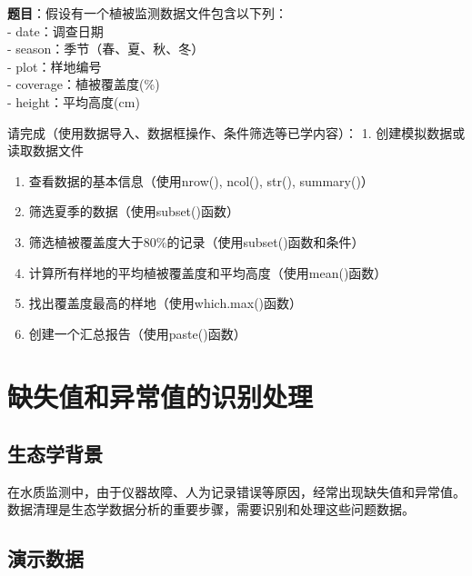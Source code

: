 \documentclass[
  twoside]{book}
\begin{document}
\textbf{题目}：假设有一个植被监测数据文件包含以下列：\\
- date：调查日期\\
- season：季节（春、夏、秋、冬）\\
- plot：样地编号\\
- coverage：植被覆盖度(\%)\\
- height：平均高度(cm)

请完成（使用数据导入、数据框操作、条件筛选等已学内容）：
1. 创建模拟数据或读取数据文件

\begin{enumerate}
\def\labelenumi{\arabic{enumi}.}
\setcounter{enumi}{1}
\item
  查看数据的基本信息（使用nrow(), ncol(), str(), summary()）
\item
  筛选夏季的数据（使用subset()函数）
\item
  筛选植被覆盖度大于80\%的记录（使用subset()函数和条件）
\item
  计算所有样地的平均植被覆盖度和平均高度（使用mean()函数）
\item
  找出覆盖度最高的样地（使用which.max()函数）
\item
  创建一个汇总报告（使用paste()函数）
\end{enumerate}

\hypertarget{ux7f3aux5931ux503cux548cux5f02ux5e38ux503cux7684ux8bc6ux522bux5904ux7406}{%
\section{缺失值和异常值的识别处理}\label{ux7f3aux5931ux503cux548cux5f02ux5e38ux503cux7684ux8bc6ux522bux5904ux7406}}

\hypertarget{ux751fux6001ux5b66ux80ccux666f-5}{%
\subsection{生态学背景}\label{ux751fux6001ux5b66ux80ccux666f-5}}

在水质监测中，由于仪器故障、人为记录错误等原因，经常出现缺失值和异常值。数据清理是生态学数据分析的重要步骤，需要识别和处理这些问题数据。

\hypertarget{ux6f14ux793aux6570ux636e-4}{%
\subsection{演示数据}\label{ux6f14ux793aux6570ux636e-4}}
\end{document}
